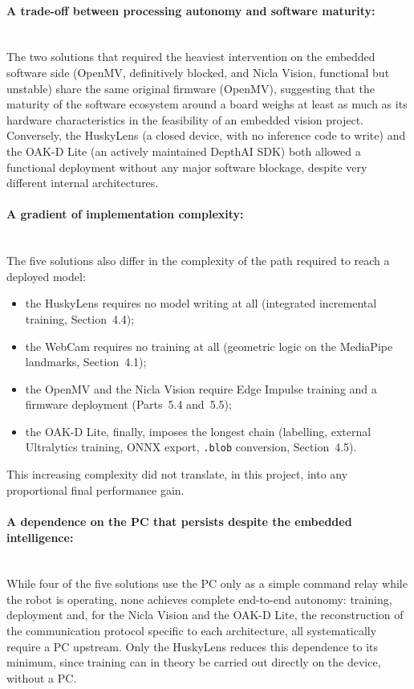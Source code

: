 \documentclass[12pt,a4paper]{report}
\begin{document}
	\paragraph{A trade-off between processing autonomy and software maturity:} \mbox{} \\ 
	The two solutions that required the heaviest intervention on the embedded software side (OpenMV, definitively blocked, and Nicla Vision, functional but unstable) share the same original firmware (OpenMV), suggesting that the maturity of the software ecosystem around a board weighs at least as much as its hardware characteristics in the feasibility of an embedded vision project. Conversely, the HuskyLens (a closed device, with no inference code to write) and the OAK-D Lite (an actively maintained DepthAI SDK) both allowed a functional deployment without any major software blockage, despite very different internal architectures.
	
	\paragraph{A gradient of implementation complexity:} \mbox{} \\ 
	The five solutions also differ in the complexity of the path required to reach a deployed model: 
	\begin{itemize}
		\item the HuskyLens requires no model writing at all (integrated incremental training, Section~4.4); 
		\item the WebCam requires no training at all (geometric logic on the MediaPipe landmarks, Section~4.1); 
		\item the OpenMV and the Nicla Vision require Edge Impulse training and a firmware deployment (Parts~5.4 and~5.5); 
		\item the OAK-D Lite, finally, imposes the longest chain (labelling, external Ultralytics training, ONNX export, \texttt{.blob} conversion, Section~4.5). 
	\end{itemize} 
	This increasing complexity did not translate, in this project, into any proportional final performance gain.
	
	\paragraph{A dependence on the PC that persists despite the embedded intelligence:} \mbox{} \\ 
	While four of the five solutions use the PC only as a simple command relay while the robot is operating, none achieves complete end-to-end autonomy: training, deployment and, for the Nicla Vision and the OAK-D Lite, the reconstruction of the communication protocol specific to each architecture, all systematically require a PC upstream. Only the HuskyLens reduces this dependence to its minimum, since training can in theory be carried out directly on the device, without a PC.
	
\end{document}
